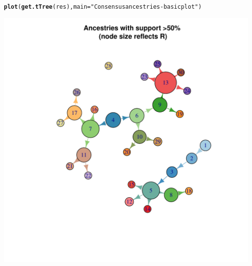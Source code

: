 \documentclass{article}\usepackage[]{graphicx}\usepackage[]{color}
\makeatletter
\newcommand{\hlstr}[1]{\textcolor[rgb]{0.192,0.494,0.8}{#1}}%
\newcommand{\hlstd}[1]{\textcolor[rgb]{0.345,0.345,0.345}{#1}}%
\newcommand{\hlkwc}[1]{\textcolor[rgb]{0.333,0.667,0.333}{#1}}%
\newcommand{\hlkwd}[1]{\textcolor[rgb]{0.737,0.353,0.396}{\textbf{#1}}}%
\newenvironment{kframe}{%
 \def\at@end@of@kframe{}%
 \ifinner\ifhmode%
  \def\at@end@of@kframe{\end{minipage}}%
  \begin{minipage}{\columnwidth}%
 \fi\fi%
 \def\FrameCommand##1{\hskip\@totalleftmargin \hskip-\fboxsep
 \colorbox{shadecolor}{##1}\hskip-\fboxsep
     \hskip-\linewidth \hskip-\@totalleftmargin \hskip\columnwidth}%
 \MakeFramed {\advance\hsize-\width
   \@totalleftmargin\z@ \linewidth\hsize
   \@setminipage}}%
 {\par\unskip\endMakeFramed%
 \at@end@of@kframe}
\newenvironment{knitrout}{}{} %
\makeatother
\begin{document}
\begin{knitrout}
\color{fgcolor}\begin{kframe}
\begin{alltt}
\hlkwd{plot}\hlstd{(}\hlkwd{get.tTree}\hlstd{(res),} \hlkwc{main}\hlstd{=}\hlstr{"Consensus ancestries - basic plot"}\hlstd{)}
\end{alltt}
\end{kframe}

{\centering \includegraphics[width=.6\textwidth]{figs/unnamed-chunk-23} 

}



\end{knitrout}
\end{document}

